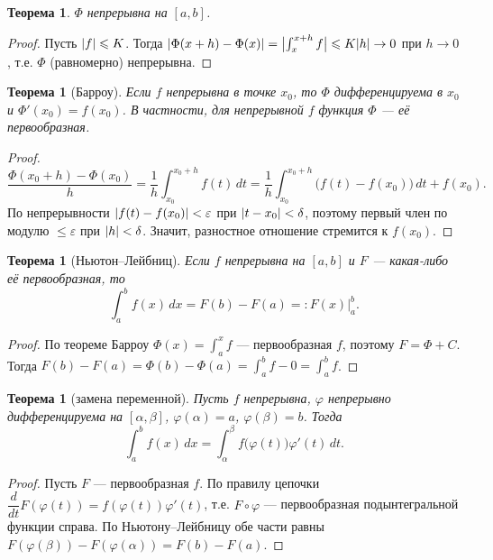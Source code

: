 \documentclass[11pt,a4paper]{article}
\theoremstyle{definition}
\theoremstyle{plain}
\newtheorem{theorem}[definition]{Теорема}
\newcommand{\dx}{\,dx}
\newcommand{\dt}{\,dt}
\newcommand{\eps}{\varepsilon}
\renewcommand{\le}{\leqslant}
\DeclarePairedDelimiter{\abs}{\lvert}{\rvert}
\begin{document}
\begin{theorem}
$\Phi$ непрерывна на $[a,b]$.
\end{theorem}

\begin{proof}
Пусть $\abs f\le K$. Тогда
$\abs{\Phi(x+h)-\Phi(x)}=\abs[\big]{\int_x^{x+h}f}\le K\abs h\to0$ при $h\to0$, т.е. $\Phi$
(равномерно) непрерывна.
\end{proof}

\begin{theorem}[Барроу]
Если $f$ непрерывна в точке $x_0$, то $\Phi$ дифференцируема в $x_0$ и $\Phi'(x_0)=f(x_0)$.
В частности, для непрерывной $f$ функция $\Phi$ — её первообразная.
\end{theorem}

\begin{proof}
\[
  \frac{\Phi(x_0+h)-\Phi(x_0)}{h}=\frac1h\int_{x_0}^{x_0+h}f(t)\dt
   =\frac1h\int_{x_0}^{x_0+h}\bigl(f(t)-f(x_0)\bigr)\dt+f(x_0).
\]
По непрерывности $\abs{f(t)-f(x_0)}<\eps$ при $\abs{t-x_0}<\delta$, поэтому первый член по модулю
$\le\eps$ при $\abs h<\delta$. Значит, разностное отношение стремится к $f(x_0)$.
\end{proof}

\begin{theorem}[Ньютон–Лейбниц]
Если $f$ непрерывна на $[a,b]$ и $F$ — какая-либо её первообразная, то
\[
  \int_a^b f(x)\dx=F(b)-F(a)=:F(x)\Big|_a^b .
\]
\end{theorem}

\begin{proof}
По теореме Барроу $\Phi(x)=\int_a^x f$ — первообразная $f$, поэтому $F=\Phi+C$. Тогда
$F(b)-F(a)=\Phi(b)-\Phi(a)=\int_a^b f-0=\int_a^b f$.
\end{proof}

\begin{theorem}[замена переменной]
Пусть $f$ непрерывна, $\varphi$ непрерывно дифференцируема на $[\alpha,\beta]$,
$\varphi(\alpha)=a$, $\varphi(\beta)=b$. Тогда
\[
  \int_a^b f(x)\dx=\int_\alpha^\beta f\bigl(\varphi(t)\bigr)\varphi'(t)\dt .
\]
\end{theorem}

\begin{proof}
Пусть $F$ — первообразная $f$. По правилу цепочки $\dfrac{d}{dt}F(\varphi(t))
=f(\varphi(t))\varphi'(t)$, т.е. $F\circ\varphi$ — первообразная подынтегральной функции справа.
По Ньютону–Лейбницу обе части равны $F(\varphi(\beta))-F(\varphi(\alpha))=F(b)-F(a)$.
\end{proof}
\end{document}
